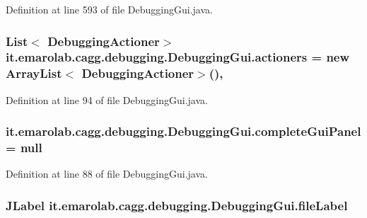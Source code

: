 Definition at line 593 of file Debugging\-Gui.\-java.

\hypertarget{classit_1_1emarolab_1_1cagg_1_1debugging_1_1DebuggingGui_a571f171ad91164c4bf9a2a27e0ddbcf8}{
\subsubsection[{actioners}]{\setlength{\rightskip}{0pt plus 5cm}List$<$ {\bf Debugging\-Actioner}$>$ it.\-emarolab.\-cagg.\-debugging.\-Debugging\-Gui.\-actioners = new Array\-List$<$ {\bf Debugging\-Actioner}$>$()\hspace{0.3cm}{\ttfamily [static]}, {\ttfamily [private]}}}\label{classit_1_1emarolab_1_1cagg_1_1debugging_1_1DebuggingGui_a571f171ad91164c4bf9a2a27e0ddbcf8}


Definition at line 94 of file Debugging\-Gui.\-java.

\hypertarget{classit_1_1emarolab_1_1cagg_1_1debugging_1_1DebuggingGui_afb478af04b658db9dcb70d49150e8c08}{
\subsubsection[{complete\-Gui\-Panel}]{ it.\-emarolab.\-cagg.\-debugging.\-Debugging\-Gui.\-complete\-Gui\-Panel = null\hspace{0.3cm}{\ttfamily [private]}}}\label{classit_1_1emarolab_1_1cagg_1_1debugging_1_1DebuggingGui_afb478af04b658db9dcb70d49150e8c08}


Definition at line 88 of file Debugging\-Gui.\-java.

\hypertarget{classit_1_1emarolab_1_1cagg_1_1debugging_1_1DebuggingGui_a423e74c9f3b4fc31b910bcc9f1c172d0}{
\subsubsection[{file\-Label}]{\setlength{\rightskip}{0pt plus 5cm}J\-Label it.\-emarolab.\-cagg.\-debugging.\-Debugging\-Gui.\-file\-Label\hspace{0.3cm}{\ttfamily [private]}}}\label{classit_1_1emarolab_1_1cagg_1_1debugging_1_1DebuggingGui_a423e74c9f3b4fc31b910bcc9f1c172d0}


